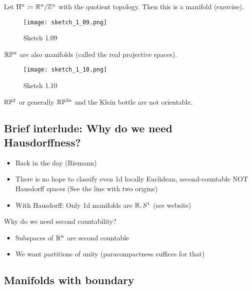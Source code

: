 \begin{example}[\(n\)-torus]
    Let \(\Pi^n\coloneqq \mathbb{R}^n/\mathbb{Z}^n\) with the quotient topology. Then this is a manifold (exercise).
    \begin{figure}[H]
        \centering
        \texttt{[image: sketch\_1\_09.png]}
        \caption{Sketch 1.09}
    \end{figure}
\end{example}

\begin{example}
    \(\mathbb{R}\mathbb{P}^n\) are also manifolds (called the real projective spaces).
\end{example}

\begin{example}
    \begin{figure}[H]
        \centering
        \texttt{[image: sketch\_1\_10.png]}
        \caption{Sketch 1.10}
    \end{figure}
\end{example}

\begin{remark}
    \(\mathbb{R}\mathbb{P}^2\) or generally \(\mathbb{R}\mathbb{P}^{2n}\) and the Klein bottle are not orientable.
\end{remark}

\subsection{Brief interlude: Why do we need Hausdorffness?}

\begin{itemize}
    \item Back in the day (Riemann) 
    \item There is no hope to classify even 1d locally Euclidean, second-countable NOT Hausdorff spaces (See the line with two origins)
    \item With Hausdorff: Only 1d manifolds are \(\mathbb{R},S^1\) (see website) 
\end{itemize}
Why do we need second countability? 
\begin{itemize}
    \item Subspaces of \(\mathbb{R}^n\) are second countable 
    \item We want partitions of unity (paracompactness suffices for that)
\end{itemize}

\subsection{Manifolds with boundary}

